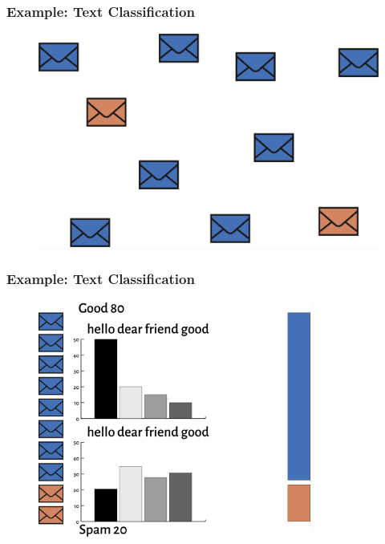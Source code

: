 \documentclass{beamer}
\begin{document}
\begin{frame}
    \frametitle{Example: Text Classification}
    \begin{figure}
        \centering
        \includegraphics[width=1\textwidth,keepaspectratio]{images/spam01}
        \caption{}
        \label{fig:spam01}
    \end{figure}

\end{frame}

\begin{frame}
    \frametitle{Example: Text Classification}
    \begin{figure}
        \centering
        \includegraphics[width=0.8\textwidth,keepaspectratio]{images/spam02}
        \caption{}
        \label{fig:spam02}
    \end{figure}
\end{frame}
\end{document}
